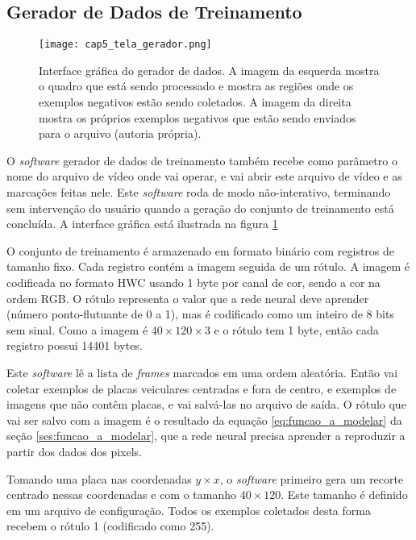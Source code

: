 \subsection{Gerador de Dados de Treinamento}

\begin{figure}[!htb]
	\centering
	\texttt{[image: cap5\_tela\_gerador.png]}
	\caption[Interface gráfica do gerador de dados]{
		Interface gráfica do gerador de dados.
		A imagem da esquerda mostra o quadro que está sendo processado e mostra as
		regiões onde os exemplos negativos estão sendo coletados. A imagem da
		direita mostra os próprios exemplos negativos que estão sendo enviados para
		o arquivo (autoria própria).}
	\label{fig:cap5_tela_gerador}
\end{figure}

O \emph{software} gerador de dados de treinamento também recebe como parâmetro
o nome do arquivo de vídeo onde vai operar, e vai abrir este arquivo de vídeo
e as marcações feitas nele. Este \emph{software} roda de modo não-interativo,
terminando sem intervenção do usuário quando a geração do conjunto de
treinamento está concluída. A interface gráfica está ilustrada na figura
\ref{fig:cap5_tela_gerador}

O conjunto de treinamento é armazenado em formato binário com registros de
tamanho fixo. Cada registro contém a imagem seguida de um rótulo. A
imagem é codificada no formato HWC usando 1 byte por canal de cor,
sendo a cor na ordem RGB. O rótulo representa o valor que a rede neural
deve aprender (número ponto-flutuante de 0 a 1), mas é codificado como um
inteiro de
8 bits sem sinal.  Como a imagem é $40 \times 120 \times 3$ e o rótulo
tem 1 byte, então cada registro possui 14401 bytes.

Este \emph{software} lê a lista de \emph{frames} marcados em uma ordem
aleatória. Então vai coletar exemplos de placas veiculares centradas e fora
de centro, e exemplos de imagens que não contêm placas, e vai salvá-las no
arquivo de saída. O rótulo que vai ser salvo com a imagem é o resultado da
equação \ref{eq:funcao_a_modelar} da seção \ref{ses:funcao_a_modelar}, que
a rede neural precisa aprender a
reproduzir a partir dos dados dos pixels.

Tomando uma placa nas coordenadas $y \times x$, o \emph{software} primeiro gera
um recorte centrado nessas coordenadas e com o tamanho $40 \times 120$. Este
tamanho é definido em um arquivo de configuração. Todos os exemplos
coletados desta forma recebem o rótulo 1 (codificado como 255).

